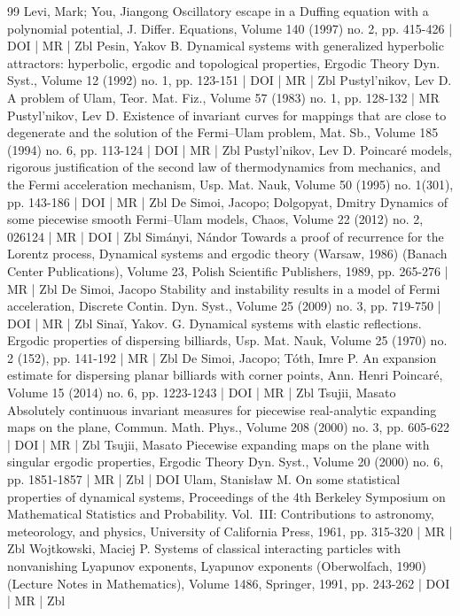 \documentclass[10pt]{amsart}
\theoremstyle{definition}\newtheorem{defi}[theo]{Definition}\newtheorem{rema}[theo]{Remark}\newtheorem{exam}[theo]{Example}\newtheorem{exem}[theo]{Example}\newtheorem{nota}[theo]{Notation}
\begin{document}
\begin{thebibliography}{99}
Levi, Mark; You, Jiangong Oscillatory escape in a Duffing equation with a polynomial potential, J. Differ. Equations, Volume 140 (1997) no. 2, pp. 415-426 | DOI | MR | Zbl
Pesin, Yakov B. Dynamical systems with generalized hyperbolic attractors: hyperbolic, ergodic and topological properties, Ergodic Theory Dyn. Syst., Volume 12 (1992) no. 1, pp. 123-151 | DOI | MR | Zbl
Pustyl’nikov, Lev D. A problem of Ulam, Teor. Mat. Fiz., Volume 57 (1983) no. 1, pp. 128-132 | MR
Pustyl’nikov, Lev D. Existence of invariant curves for mappings that are close to degenerate and the solution of the Fermi–Ulam problem, Mat. Sb., Volume 185 (1994) no. 6, pp. 113-124 | DOI | MR | Zbl
Pustyl’nikov, Lev D. Poincaré models, rigorous justification of the second law of thermodynamics from mechanics, and the Fermi acceleration mechanism, Usp. Mat. Nauk, Volume 50 (1995) no. 1(301), pp. 143-186 | DOI | MR | Zbl
De Simoi, Jacopo; Dolgopyat, Dmitry Dynamics of some piecewise smooth Fermi–Ulam models, Chaos, Volume 22 (2012) no. 2, 026124 | MR | DOI | Zbl
Simányi, Nándor Towards a proof of recurrence for the Lorentz process, Dynamical systems and ergodic theory (Warsaw, 1986) (Banach Center Publications), Volume 23, Polish Scientific Publishers, 1989, pp. 265-276 | MR | Zbl
De Simoi, Jacopo Stability and instability results in a model of Fermi acceleration, Discrete Contin. Dyn. Syst., Volume 25 (2009) no. 3, pp. 719-750 | DOI | MR | Zbl
Sinaĭ, Yakov. G. Dynamical systems with elastic reflections. Ergodic properties of dispersing billiards, Usp. Mat. Nauk, Volume 25 (1970) no. 2 (152), pp. 141-192 | MR | Zbl
De Simoi, Jacopo; Tóth, Imre P. An expansion estimate for dispersing planar billiards with corner points, Ann. Henri Poincaré, Volume 15 (2014) no. 6, pp. 1223-1243 | DOI | MR | Zbl
Tsujii, Masato Absolutely continuous invariant measures for piecewise real-analytic expanding maps on the plane, Commun. Math. Phys., Volume 208 (2000) no. 3, pp. 605-622 | DOI | MR | Zbl
Tsujii, Masato Piecewise expanding maps on the plane with singular ergodic properties, Ergodic Theory Dyn. Syst., Volume 20 (2000) no. 6, pp. 1851-1857 | MR | Zbl | DOI
Ulam, Stanisław M. On some statistical properties of dynamical systems, Proceedings of the 4th Berkeley Symposium on Mathematical Statistics and Probability. Vol. III: Contributions to astronomy, meteorology, and physics, University of California Press, 1961, pp. 315-320 | MR | Zbl
Wojtkowski, Maciej P. Systems of classical interacting particles with nonvanishing Lyapunov exponents, Lyapunov exponents (Oberwolfach, 1990) (Lecture Notes in Mathematics), Volume 1486, Springer, 1991, pp. 243-262 | DOI | MR | Zbl

\end{thebibliography}
\end{document}
